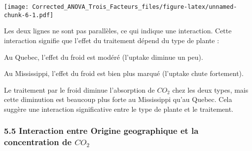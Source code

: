 \documentclass[
]{article}
\begin{document}
\texttt{[image: Corrected\_ANOVA\_Trois\_Facteurs\_files/figure-latex/unnamed-chunk-6-1.pdf]}

Les deux lignes ne sont pas parallèles, ce qui indique une interaction.
Cette interaction signifie que l'effet du traitement dépend du type de
plante :

Au Quebec, l'effet du froid est modéré (l'uptake diminue un peu).

Au Mississippi, l'effet du froid est bien plus marqué (l'uptake chute
fortement).

Le traitement par le froid diminue l'absorption de \(CO_2\) chez les
deux types, mais cette diminution est beaucoup plus forte au Mississippi
qu'au Quebec. Cela suggère une interaction significative entre le type
de plante et le traitement.

\subsubsection{\texorpdfstring{5.5 Interaction entre Origine
geographique et la concentration de
\(CO_2\)}{5.5 Interaction entre Origine geographique et la concentration de CO\_2}}\label{interaction-entre-origine-geographique-et-la-concentration-de-co_2}
\end{document}
